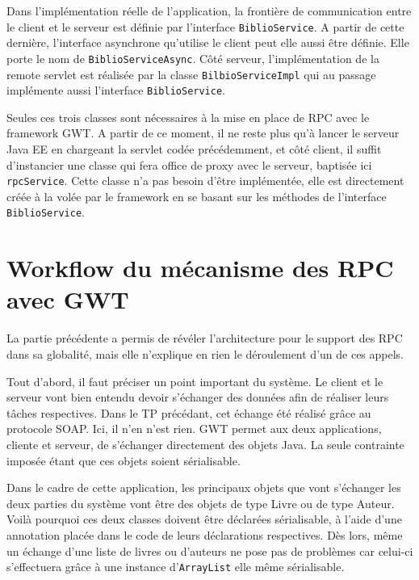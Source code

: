 
Dans l'implémentation réelle de l'application, la frontière de communication entre le client et le serveur est définie par l'interface \verb|BiblioService|. A partir de cette dernière, l'interface asynchrone qu'utilise le client peut elle aussi être définie. Elle porte le nom de \verb|BiblioServiceAsync|. Côté serveur, l'implémentation de la remote servlet est réalisée par la classe \verb|BilbioServiceImpl| qui au passage implémente aussi l'interface \verb|BiblioService|.

Seules ces trois classes sont nécessaires à la mise en place de RPC avec le framework GWT. A partir de ce moment, il ne reste plus qu'à lancer le serveur Java EE en chargeant la servlet codée précédemment, et côté client, il suffit d'instancier une classe qui fera office de proxy avec le serveur, baptisée ici \verb|rpcService|. Cette classe n'a pas besoin d'être implémentée, elle est directement créée à la volée par le framework en se basant sur les méthodes de l'interface \verb|BiblioService|.

\section{Workflow du mécanisme des RPC avec GWT}
La partie précédente a permis de révéler l'architecture pour le support des RPC dans sa globalité, mais elle n'explique en rien le déroulement d'un de ces appels.

Tout d'abord, il faut préciser un point important du système. Le client et le serveur vont bien entendu devoir s'échanger des données afin de réaliser leurs tâches respectives. Dans le TP précédant, cet échange été réalisé grâce au protocole SOAP. Ici, il n'en n'est rien. GWT permet aux deux applications, cliente et serveur, de s'échanger directement des objets Java. La seule contrainte imposée étant que ces objets soient sérialisable.

Dans le cadre de cette application, les principaux objets que vont s'échanger les deux parties du système vont être des objets de type Livre ou de type Auteur. Voilà pourquoi ces deux classes doivent être déclarées sérialisable, à l'aide d'une annotation placée dans le code de leurs déclarations respectives. Dès lors, même un échange d'une liste de livres ou d'auteurs ne pose pas de problèmes car celui-ci s'effectuera grâce à une instance d'\verb|ArrayList| elle même sérialisable.

